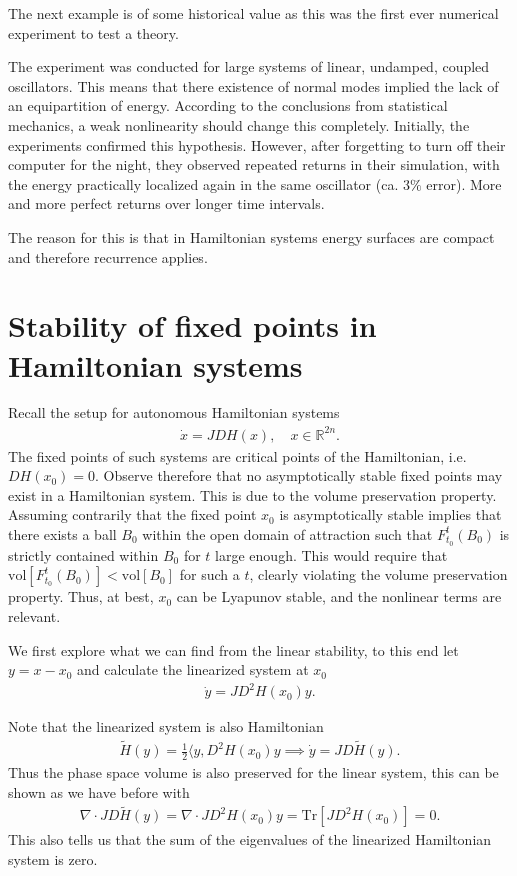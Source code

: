 The next example is of some historical value as this was the first ever numerical experiment to test a theory.
\begin{ex}
	The experiment was conducted for large systems of linear, undamped, coupled oscillators. This means that there existence of normal modes implied the lack of an equipartition of energy. According to the conclusions from statistical mechanics, a weak nonlinearity should change this completely. Initially, the experiments confirmed this hypothesis. However, after forgetting to turn off their computer for the night, they observed repeated returns in their simulation, with the energy practically localized again in the same oscillator (ca. $3\%$ error). More and more perfect returns over longer time intervals.

	The reason for this is that in Hamiltonian systems energy surfaces are compact and therefore recurrence applies. 
\end{ex}

\section{Stability of fixed points in Hamiltonian systems}
Recall the setup for autonomous Hamiltonian systems
\begin{align}
	\dot{x} = JDH(x),\quad x \in \mathbb{R}^{2n}.
\end{align}
The fixed points of such systems are critical points of the Hamiltonian, i.e. $DH(x_0) = 0$. Observe therefore that no asymptotically stable fixed points may exist in a Hamiltonian system. This is due to the volume preservation property. Assuming contrarily that the fixed point $x_0$ is asymptotically stable implies that there exists a ball $B_0$ within the open domain of attraction such that $F_{t_0}^{t}(B_0)$ is strictly contained within $B_0$ for $t $ large enough. This would require that $ \textrm{vol} [F_{t_0}^{t}(B_0)] <  \textrm{vol} [B_0]$ for such a $t$, clearly violating the volume preservation property. Thus, at best, $x_0$ can be Lyapunov stable, and the nonlinear terms are relevant. 

We first explore what we can find from the linear stability, to this end let $y=x-x_0$ and calculate the linearized system at $x_0$
\begin{align}
	\dot{y} = JD^{2}H(x_0)y. \label{eq8:lin_hamiltonian}
\end{align}

Note that the linearized system is also Hamiltonian
\begin{align}
	\tilde{H}(y) = \frac{1}{2} \langle y, D^{2}H(x_0)y \implies \dot{y} = JD\tilde{H}(y).
\end{align}
Thus the phase space volume is also preserved for the linear system, this can be shown as we have before with
\begin{align}
	\nabla \cdot JD\tilde{H}(y) =  \nabla \cdot JD^2H(x_0) y =  \textrm{Tr} [JD^2H(x_0)] = 0.
\end{align}
This also tells us that the sum of the eigenvalues of the linearized Hamiltonian system is zero.


